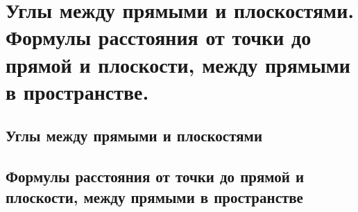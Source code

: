 \chapter{Углы между прямыми и плоскостями. Формулы расстояния от точки до прямой и плоскости, между прямыми в пространстве.}
\section{Углы между прямыми и плоскостями}
\section{Формулы расстояния от точки до прямой и плоскости, между прямыми в пространстве}